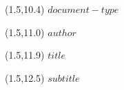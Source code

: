 \documentclass[a4paper,$if(font-size)$$font-size$$else$12$endif$pt,openany]{book}
\begin{document}
\thispagestyle{empty}

\begin{textblock}{12}(1.5,10.4) \noindent\fontsize{20}{20}\selectfont \textbf{$document-type$}
\end{textblock}

\begin{textblock}{12}(1.5,11.0) \noindent\fontsize{14}{14}\selectfont $author$
\end{textblock}

\begin{textblock}{12}(1.5,11.9)
\noindent\fontsize{20}{20}\selectfont \textbf{$title$}
\end{textblock}

\begin{textblock}{12}(1.5,12.5)
    \noindent\fontsize{14}{14}\selectfont $subtitle$
\end{textblock}
\end{document}
